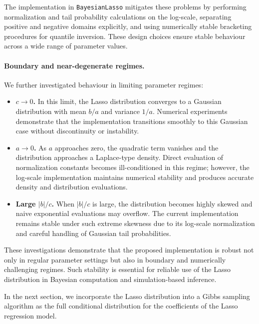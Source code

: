 The implementation in \texttt{BayesianLasso} mitigates these problems by performing normalization and tail probability calculations on the log-scale, separating positive and negative domains explicitly, and using numerically stable bracketing procedures for quantile inversion. These design choices ensure stable behaviour across a wide range of parameter values.

\paragraph{Boundary and near-degenerate regimes.}
We further investigated behaviour in limiting parameter regimes:

\begin{itemize}
\item \textbf{$c \to 0$.} In this limit, the Lasso distribution converges to a Gaussian distribution with mean $b/a$ and variance $1/a$. Numerical experiments demonstrate that the implementation transitions smoothly to this Gaussian case without discontinuity or instability.

\item \textbf{$a \to 0$.} As $a$ approaches zero, the quadratic term vanishes and the distribution approaches a Laplace-type density. Direct evaluation of normalization constants becomes ill-conditioned in this regime; however, the log-scale implementation maintains numerical stability and produces accurate density and distribution evaluations.

\item \textbf{Large $|b|/c$.} When $|b|/c$ is large, the distribution becomes highly skewed and naive exponential evaluations may overflow. The current implementation remains stable under such extreme skewness due to its log-scale normalization and careful handling of Gaussian tail probabilities.
\end{itemize}

These investigations demonstrate that the proposed implementation is robust not only in regular parameter settings but also in boundary and numerically challenging regimes. Such stability is essential for reliable use of the Lasso distribution in Bayesian computation and simulation-based inference.


In the next section, we incorporate the Lasso distribution into a Gibbs sampling algorithm as the full conditional distribution for the coefficients of the Lasso regression model.


